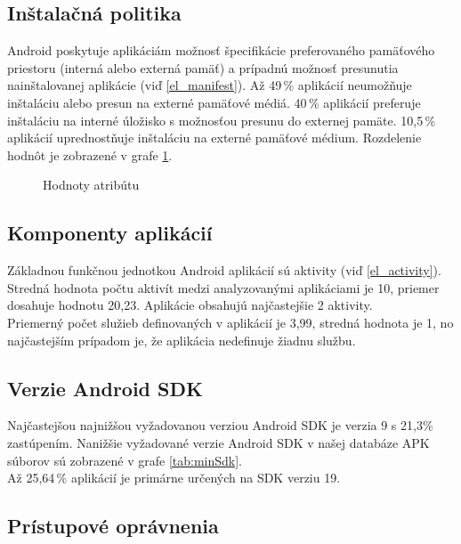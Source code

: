 \subsection*{Inštalačná politika}
Android poskytuje aplikáciám možnosť špecifikácie preferovaného pamäťového priestoru (interná alebo externá pamäť) a prípadnú možnosť presunutia nainštalovanej aplikácie (viď \ref{el_manifest}). Až 49\,\% aplikácií neumožňuje inštaláciu alebo presun na externé pamäťové médiá.  40\,\% aplikácií preferuje inštaláciu na interné úložisko s možnosťou presunu do externej pamäte. 10,5\,\% aplikácií uprednostňuje inštaláciu na externé pamäťové médium. Rozdelenie hodnôt je zobrazené v grafe \ref{fig:installLoc}.

\begin{figure}[!htbp]
\centering
{}
\label{fig:installLoc}
\caption{Hodnoty atribútu }
\end{figure}

\subsection*{Komponenty aplikácií}

Základnou funkčnou jednotkou Android aplikácií sú aktivity (viď \ref{el_activity}). Stredná hodnota počtu aktivít medzi analyzovanými aplikáciami je  10, priemer dosahuje hodnotu 20,23. Aplikácie obsahujú najčastejšie 2 aktivity.\\Priemerný počet služieb definovaných v aplikácií je 3,99, stredná hodnota je 1, no najčastejším prípadom je, že aplikácia nedefinuje žiadnu službu.

\subsection*{Verzie Android SDK}

Najčastejšou najnižšou vyžadovanou verziou Android SDK je verzia 9 s 21,3\% zastúpením. Nanižšie vyžadované verzie Android SDK v našej databáze APK súborov sú zobrazené v grafe \ref{tab:minSdk}.
\\Až 25,64\,\% aplikácií je primárne určených na SDK verziu 19.

\subsection*{Prístupové oprávnenia}

